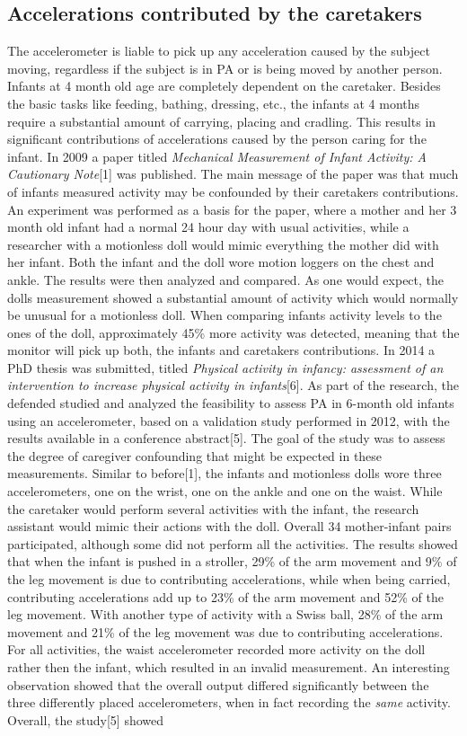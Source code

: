 \documentclass{article}
\begin{document}
{\subsection{Accelerations contributed by the caretakers}
The accelerometer is liable to pick up any acceleration caused by the subject moving, regardless if the subject is in PA or is being moved by another person. Infants at 4 month old age are completely dependent on the caretaker. Besides the basic tasks like feeding, bathing, dressing, etc., the infants at 4 months require a substantial amount of carrying, placing and cradling. This results in significant contributions of accelerations caused by the person caring for the infant. In 2009 a paper titled \textit{Mechanical Measurement of Infant Activity: A Cautionary Note}[1] was published. The main message of the paper was that much of infants measured activity may be confounded by their caretakers contributions. An experiment was performed as a basis for the paper, where a mother and her 3 month old infant had a normal 24 hour day with usual activities, while a researcher with a motionless doll would mimic everything the mother did with her infant. Both the infant and the doll wore motion loggers on the chest and ankle. The results were then analyzed and compared. As one would expect, the dolls measurement showed a substantial amount of activity which would normally be unusual for a motionless doll. When comparing infants activity levels to the ones of the doll, approximately 45\% more activity was detected, meaning that the monitor will pick up both, the infants and caretakers contributions. In 2014 a PhD thesis was submitted, titled \textit{Physical activity in infancy: assessment of an intervention to increase physical activity in infants}[6]. As part of the research, the defended studied and analyzed the feasibility to assess PA in 6-month old infants using an accelerometer, based on a validation study performed in 2012, with the results available in a conference abstract[5]. The goal of the study was to assess the degree of caregiver confounding that might be expected in these measurements. Similar to before[1], the infants and motionless dolls wore three accelerometers, one on the wrist, one on the ankle and one on the waist. While the caretaker would perform several activities with the infant, the research assistant would mimic their actions with the doll. Overall 34 mother-infant pairs participated, although some did not perform all the activities. The results showed that when the infant is pushed in a stroller, 29\% of the arm movement and 9\% of the leg movement is due to contributing accelerations, while when being carried, contributing accelerations add up to 23\% of the arm movement and 52\% of the leg movement. With another type of activity with a Swiss ball, 28\% of the arm movement and 21\% of the leg movement was due to contributing accelerations. For all activities, the waist accelerometer recorded more activity on the doll rather then the infant, which resulted in an invalid measurement. An interesting observation showed that the overall output differed significantly between the three differently placed accelerometers, when in fact recording the \textit{same} activity. Overall, the study[5] showed }
\end{document}
